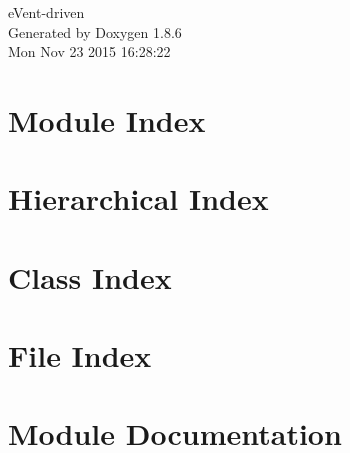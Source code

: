 \documentclass[twoside]{book}
\newcommand{\clearemptydoublepage}{%
  \newpage{\pagestyle{empty}\cleardoublepage}%
}
\begin{document}
\hypersetup{pageanchor=false}
\begin{titlepage}
\vspace*{7cm}
\begin{center}%
{\Large e\-Vent-\/driven }\\
\vspace*{1cm}
{\large Generated by Doxygen 1.8.6}\\
\vspace*{0.5cm}
{\small Mon Nov 23 2015 16:28:22}\\
\end{center}
\end{titlepage}
\clearemptydoublepage
\tableofcontents
\clearemptydoublepage
{}
\hypersetup{pageanchor=true}

\chapter{Module Index}

\chapter{Hierarchical Index}

\chapter{Class Index}

\chapter{File Index}

\chapter{Module Documentation}





















\end{document}
